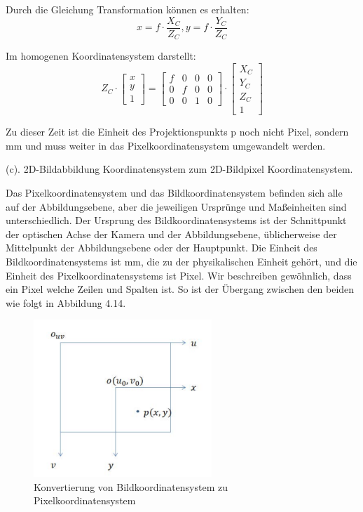 Durch die Gleichung Transformation können es erhalten: 
\begin{equation}
   x = f \cdot \frac{X_C}{Z_C}, y = f \cdot \frac{Y_C}{Z_C}
\end{equation}

Im homogenen Koordinatensystem darstellt:
\begin{equation}
   Z_C \cdot \begin{bmatrix}
	x \\  
	y \\
	1
	\end{bmatrix} = \begin{bmatrix}
	f & 0 & 0 & 0	\\
	0 & f & 0 & 0	\\
	0 & 0 & 1 & 0	
	\end{bmatrix} \cdot \begin{bmatrix}
	X_C \\  
	Y_C \\
	Z_C \\
	1
	\end{bmatrix}
\end{equation}

Zu dieser Zeit ist die Einheit des Projektionspunkts p noch nicht Pixel, sondern mm und muss weiter in das Pixelkoordinatensystem umgewandelt werden.

(c). 2D-Bildabbildung Koordinatensystem zum 2D-Bildpixel Koordinatensystem.

Das Pixelkoordinatensystem und das Bildkoordinatensystem befinden sich alle auf der Abbildungsebene, aber die jeweiligen Ursprünge und Maßeinheiten sind unterschiedlich. Der Ursprung des Bildkoordinatensystems ist der Schnittpunkt der optischen Achse der Kamera und der Abbildungsebene, üblicherweise der Mittelpunkt der Abbildungsebene oder der Hauptpunkt. Die Einheit des Bildkoordinatensystems ist mm, die zu der physikalischen Einheit gehört, und die Einheit des Pixelkoordinatensystems ist Pixel. Wir beschreiben gewöhnlich, dass ein Pixel welche Zeilen und Spalten ist. So ist der Übergang zwischen den beiden wie folgt in Abbildung 4.14. 

\begin{figure}[htb]
 \centering 
 \includegraphics[keepaspectratio,width=0.6\textwidth]{images/4_ZweiteErfahrung/Kamera/imagezupixel.pdf}
 \caption{Konvertierung von Bildkoordinatensystem zu Pixelkoordinatensystem}
 \label{fig:Konvertierung von Pixelkoordinatensystem zu Bildkoordinatensystem}
\end{figure} 

